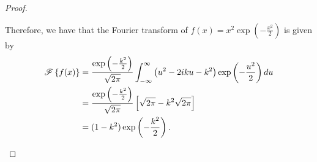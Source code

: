 \begin{proof}
\begin{enumerate}
      Therefore, we have that the Fourier transform of $\displaystyle f(x) = x^2 \exp \left( -\frac{x^2}{2} \right)$ is given by
      \begin{align*}
        \mathscr{F}\left\{ {f(x)} \right\} &= \frac{\exp\left( -\frac{k^2}{2} \right)}{\sqrt{2 \pi}} \int_{-\infty}^{\infty} \left(u^2 -2 i k u - k^2\right) \exp\left(-\frac{u^2}{2}  \right)  du \\
        &= \frac{\exp\left( -\frac{k^2}{2} \right)}{\sqrt{2 \pi}}  \left[\sqrt{2\pi} -k^2\sqrt{2\pi}\right] \\
        &= (1-k^2)\exp\left( -\frac{k^2}{2} \right).
      \end{align*}

  \end{enumerate}
\end{proof}
\newpage
